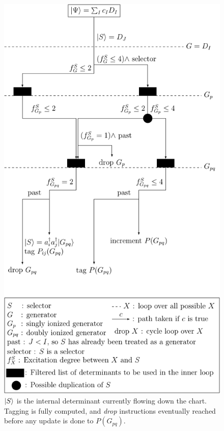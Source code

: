 \documentclass[./thesis.tex]{subfiles}
\begin{document}
\begin{figure}[h!]
        \begin{center}
                \includegraphics[height=0.90\textheight]{figures/cipsi/selection}
        \end{center}
        \caption{$\ket S$ is the internal determinant currently flowing down the chart.
        Tagging is fully computed, and \emph{drop} instructions eventually reached before any update is done to $P(G_{pq})$.}
        \label{fig:selection}   
\end{figure}
\end{document}
